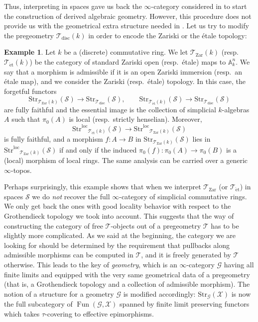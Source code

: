 \documentclass[12pt,a4paper,reqno]{amsart}
\theoremstyle{plain}
\theoremstyle{definition}
\newtheorem{eg-intro}[thm-intro]{Example}
\theoremstyle{remark}
\numberwithin{equation}{section}
\begin{document}
Thus, interpreting in spaces gave us back the $\infty$-category considered in \cite{HAG-II} to start the construction of derived algebraic geometry. However, this procedure does not provide us with the geometrical extra structure needed in \cite{HAG-II}.
Let us try to modify the pregeometry ${{\mathcal T}_{\mathrm{disc}}(k)}$ in order to encode the Zariski or the \'etale topology:

\begin{eg-intro}
	Let $k$ be a (discrete) commutative ring. We let ${{\mathcal T}_{\mathrm{Zar}}}(k)$ (resp.\ ${{\mathcal T}_{\mathrm{\acute{e}t}}}(k)$) be the category of standard Zariski open (resp.\ \'etale) maps to $\mathbb A^n_k$. We say that a morphism is admissible if it is an open Zariski immersion (resp.\ an \'etale map), and we consider the Zariski (resp.\ \'etale) topology.
	In this case, the forgetful functors
	\[ {\mathrm{Str}}_{{{\mathcal T}_{\mathrm{Zar}}}(k)}({\mathcal S}) \to {\mathrm{Str}}_{{\mathcal T}_{\mathrm{disc}}}({\mathcal S}), \qquad {\mathrm{Str}}_{{{\mathcal T}_{\mathrm{\acute{e}t}}}(k)}({\mathcal S}) \to {\mathrm{Str}}_{{\mathcal T}_{\mathrm{disc}}}({\mathcal S}) \]
	are fully faithful and the essential image is the collection of simplicial $k$-algebras $A$ such that $\pi_0(A)$ is local (resp.\ strictly henselian). Moreover,
	\[ {\mathrm{Str}^\mathrm{loc}}_{{{\mathcal T}_{\mathrm{\acute{e}t}}}(k)}({\mathcal S}) \to {\mathrm{Str}^\mathrm{loc}}_{{{\mathcal T}_{\mathrm{Zar}}}(k)}({\mathcal S}) \]
	is fully faithful, and a morphism $f \colon A \to B$ in ${\mathrm{Str}}_{{{\mathcal T}_{\mathrm{Zar}}}(k)}({\mathcal S})$ lies in ${\mathrm{Str}^\mathrm{loc}}_{{{\mathcal T}_{\mathrm{Zar}}}(k)}({\mathcal S})$ if and only if the induced $\pi_0(f) \colon \pi_0(A) \to \pi_0(B)$ is a (local) morphism of local rings. The same analysis can be carried over a generic $\infty$-topos.
\end{eg-intro}

Perhaps surprisingly, this example shows that when we interpret ${{\mathcal T}_{\mathrm{Zar}}}$ (or ${{\mathcal T}_{\mathrm{\acute{e}t}}}$) in spaces ${\mathcal S}$ we do \emph{not} recover the full $\infty$-category of simplicial commutative rings. We only get back the ones with good locality behavior with respect to the Grothendieck topology we took into account.
This suggests that the way of constructing the category of free ${\mathcal T}$-objects out of a pregeometry ${\mathcal T}$ has to be slightly more complicated.
As we said at the beginning, the category we are looking for should be determined by the requirement that pullbacks along admissible morphisms can be computed in ${\mathcal T}$, and it is freely generated by ${\mathcal T}$ otherwise.
This leads to the key of \emph{geometry}, which is an $\infty$-category ${\mathcal G}$ having all finite limits and equipped with the very same geometrical data of a pregeometry (that is, a Grothendieck topology and a collection of admissible morphism).
The notion of a structure for a geometry ${\mathcal G}$ is modified accordingly: ${\mathrm{Str}}_{\mathcal G}({\mathcal X})$ is now the full subcategory of $\operatorname{Fun}({\mathcal G}, {\mathcal X})$ spanned by finite limit preserving functors which takes $\tau$-covering to effective epimorphisms.
\end{document}

